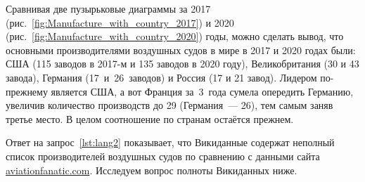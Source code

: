 

Сравнивая две пузырьковые диаграммы за 2017 (рис.~\ref{fig:Manufacture_with_country_2017}) и 2020 (рис.~\ref{fig:Manufacture_with_country_2020}) годы, можно сделать вывод, что основными производителями воздушных судов в мире 
в 2017 и 2020 годах были: США (115 заводов в 2017-м и 135 заводов в 2020 году), 
Великобритания (30 и 43 завода), Германия (17~и~26~заводов) и Россия (17 и 21 завод). Лидером по-прежнему является США, 
а вот Франция за~3~года сумела опередить Германию, 
увеличив количество производств до 29 (Германия~--- 26), 
тем самым заняв третье место. 
В целом соотношение по странам остаётся прежнем.

Ответ на запрос~\ref{lst:lang2} показывает, 
что Викиданные содержат неполный список производителей воздушных судов 
по сравнению с данными сайта \href{https://www.aviationfanatic.com/}{aviationfanatic.com}. 
Исследуем вопрос полноты Викиданных ниже. 


